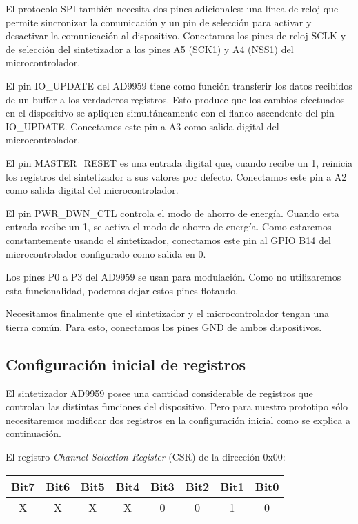 \documentclass{article}
\newenvironment{standalone}{\begin{preview}}{\end{preview}}
\begin{document}
\begin{standalone}
  El protocolo SPI también necesita dos pines adicionales: una línea de reloj que permite sincronizar la comunicación y un pin de selección para activar y desactivar la comunicación al dispositivo.
  Conectamos los pines de reloj SCLK y de selección  del sintetizador a los pines A5 (SCK1) y A4 (NSS1) del microcontrolador.

  El pin IO\_UPDATE del AD9959 tiene como función transferir los datos recibidos de un buffer a los verdaderos registros.
  Esto produce que los cambios efectuados en el dispositivo se apliquen simultáneamente con el flanco ascendente del pin IO\_UPDATE.
  Conectamos este pin a A3 como salida digital del microcontrolador.

  El pin MASTER\_RESET es una entrada digital que, cuando recibe un 1, reinicia los registros del sintetizador a sus valores por defecto.
  Conectamos este pin a A2 como salida digital del microcontrolador.

  El pin PWR\_DWN\_CTL controla el modo de ahorro de energía.
  Cuando esta entrada recibe un 1, se activa el modo de ahorro de energía.
  Como estaremos constantemente usando el sintetizador, conectamos este pin al GPIO B14 del microcontrolador configurado como salida en 0.

  Los pines P0 a P3 del AD9959 se usan para modulación.
  Como no utilizaremos esta funcionalidad, podemos dejar estos pines flotando.

  Necesitamos finalmente que el sintetizador y el microcontrolador tengan una tierra común.
  Para esto, conectamos los pines GND de ambos dispositivos.

  \subsection{Configuración inicial de registros}

  El sintetizador AD9959 posee una cantidad considerable de registros que controlan las distintas funciones del dispositivo.
  Pero para nuestro prototipo sólo necesitaremos modificar dos registros en la configuración inicial como se explica a continuación.

  El registro \textit{Channel Selection Register} (CSR) de la dirección 0x00:
  \begin{table}[!htbp]
    \centering
    \begin{tabular}{|c|c|c|c|c|c|c|c|}
    \hline
    \rowcolor[HTML]{EFEFEF}
    Bit7 & Bit6 & Bit5 & Bit4 & Bit3 & Bit2 & Bit1 & Bit0 \\ \hline
    X    & X    & X    & X    & 0    & 0    & 1    & 0    \\ \hline
    \end{tabular}
  \end{table}


\end{standalone}
\end{document}
